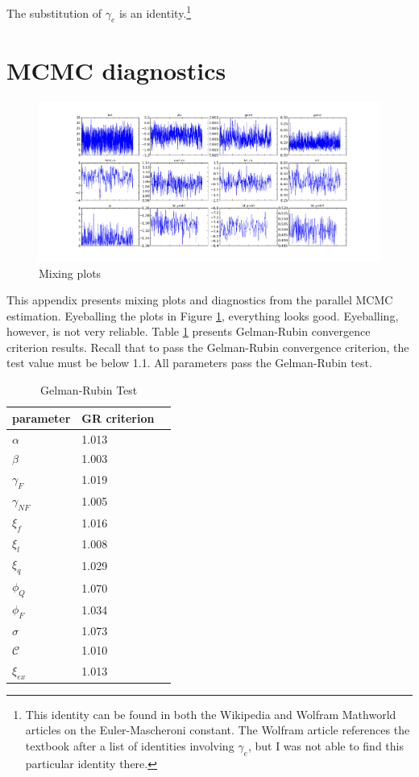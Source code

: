 \documentclass[]{article}
\makeatletter
\def\maxwidth{\ifdim\Gin@nat@width>\linewidth\linewidth
\else\Gin@nat@width\fi}
\let\Oldincludegraphics\includegraphics
\renewcommand{\includegraphics}[1]{\Oldincludegraphics[width=\maxwidth]{#1}}
\makeatother
\begin{document}
The substitution of $\gamma_e$ is an identity.\footnote{This identity can be found in both the Wikipedia and Wolfram Mathworld articles on the Euler-Mascheroni constant.  The Wolfram article references the textbook \citet{whittaker1996course} after a list of identities involving $\gamma_e$, but I was not able to find this particular identity there.}

\section{MCMC diagnostics}
\label{sec:MCMC_diag}

\begin{figure}[h!]
    \includegraphics{pics/params_plots_big.png}
    \caption{Mixing plots}
    \label{fig:mix}
\end{figure}

This appendix presents mixing plots and diagnostics from the parallel
MCMC estimation. Eyeballing the plots in Figure \ref{fig:mix}, everything looks good.  Eyeballing,
however, is not very reliable.
Table \ref{tab:grtest} presents Gelman-Rubin convergence criterion results. Recall that to pass the
Gelman-Rubin convergence criterion, the test value must be below 1.1.
All parameters pass the Gelman-Rubin test.

\begin{table}[h!]
    \centering
    \begin{tabular}{|l|l|l|}
        \hline
        parameter       & GR criterion \\ \hline
        $\alpha$        & 1.013  \\
        $\beta$         & 1.003  \\
        $\gamma_{F}$    & 1.019  \\
        $\gamma_{NF}$   & 1.005  \\
        $\xi_f$         & 1.016  \\
        $\xi_l$         & 1.008  \\
        $\xi_q$         & 1.029  \\
        $\phi_Q$        & 1.070  \\
        $\phi_F$        & 1.034  \\
        $\sigma$        & 1.073  \\
        $\mathcal{C}$   & 1.010  \\
        $\xi_{ex}$      & 1.013  \\ \hline
    \end{tabular}
    \caption{Gelman-Rubin Test}
    \label{tab:grtest}
\end{table}
\end{document}
